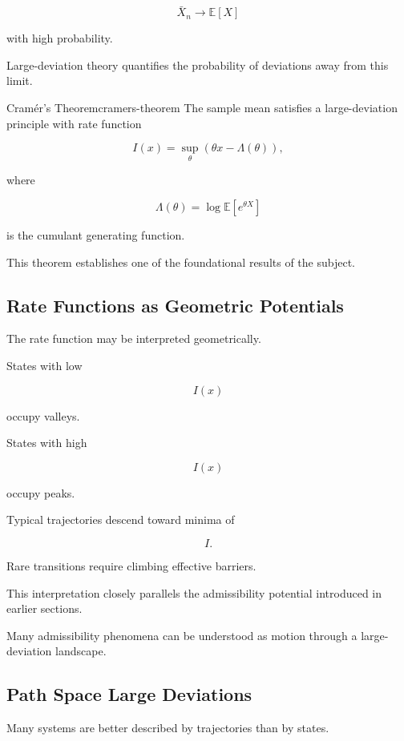 \documentclass[12pt,twoside,openright]{book}
\newenvironment{rem}
{\begin{remark}{}{}}
{\end{remark}}
\begin{document}
\[
\bar X_n
\rightarrow
\mathbb E[X]
\]

with high probability.

Large-deviation theory quantifies the probability of
deviations away from this limit.

\begin{theorem}{Cramér's Theorem}{cramers-theorem}
The sample mean satisfies a large-deviation principle with
rate function

\[
I(x)
=
\sup_{\theta}
\left(
\theta x
-
\Lambda(\theta)
\right),
\]

where

\[
\Lambda(\theta)
=
\log
\mathbb E[e^{\theta X}]
\]

is the cumulant generating function.
\end{theorem}

This theorem establishes one of the foundational results
of the subject.

\subsection{Rate Functions as Geometric Potentials}

The rate function may be interpreted geometrically.

States with low

\[
I(x)
\]

occupy valleys.

States with high

\[
I(x)
\]

occupy peaks.

Typical trajectories descend toward minima of

\[
I.
\]

Rare transitions require climbing effective barriers.

This interpretation closely parallels the admissibility
potential introduced in earlier sections.

\begin{rem}
Many admissibility phenomena can be understood as motion
through a large-deviation landscape.
\end{rem}

\subsection{Path Space Large Deviations}

Many systems are better described by trajectories than by
states.
\end{document}
